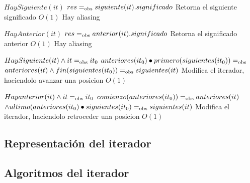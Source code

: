  {$HaySiguiente(it)$}
 {$res =_{\mathrm{obs}} siguiente(it).significado$}
 {Retorna el siguiente significado}
 {$O(1)$}
 {Hay aliasing}

 {$HayAnterior(it)$}
 {$res =_{\mathrm{obs}} anterior(it).significado$}
 {Retorna el significado anterior}
 {$O(1)$}
 {Hay aliasing}

 {$HaySiguiente(it) \land it =_{\mathrm{obs}} it_0$}
 {$anteriores(it_0) \bullet primero(siguientes(it_0)) =_{\mathrm{obs}}$\\$anteriores(it) \land fin(siguientes(it_0)) =_{\mathrm{obs}} siguientes(it)$}
 {Modifica el iterador, haciendolo avanzar una posicion}
 {$O(1)$}
 {}

 {$Hay anterior(it) \land it =_{\mathrm{obs}} it_0$}
 {$comienzo(anteriores(it_0)) =_{\mathrm{obs}} anteriores(it)$\\$\land ultimo(anteriores(it_0) \bullet siguientes(it_0) =_{\mathrm{obs}} siguientes(it)$}
 {Modifica el iterador, haciendolo retroceder una posicion}
 {$O(1)$}
 {}

\subsection{Representación del iterador}



\subsection{Algoritmos del iterador}






